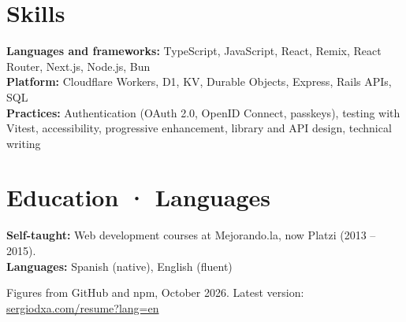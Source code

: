 \documentclass[10pt,letterpaper]{article}
\begin{document}
\section*{Skills}
\textbf{Languages and frameworks:} TypeScript, JavaScript, React, Remix, React Router, Next.js, Node.js, Bun\\
\textbf{Platform:} Cloudflare Workers, D1, KV, Durable Objects, Express, Rails APIs, SQL\\
\textbf{Practices:} Authentication (OAuth 2.0, OpenID Connect, passkeys), testing with Vitest, accessibility, progressive enhancement, library and API design, technical writing\\

\section*{Education · Languages}
\textbf{Self-taught:} Web development courses at Mejorando.la, now Platzi (2013 – 2015).\\
\textbf{Languages:} Spanish (native), English (fluent)

\vfill
{\footnotesize\color{muted}Figures from GitHub and npm, October 2026. Latest version: \href{https://sergiodxa.com/resume?lang=en}{sergiodxa.com/resume?lang=en}}
\end{document}
